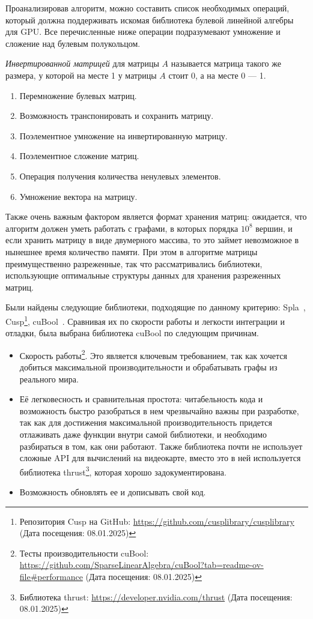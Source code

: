 Проанализировав алгоритм, можно составить список необходимых операций, который должна поддерживать искомая библиотека булевой линейной алгебры для GPU. Все перечисленные ниже операции подразумевают умножение и сложение над булевым полукольцом.

\textit{Инвертированной матрицей} для матрицы $A$ называется матрица такого же размера, у которой на месте 1 у матрицы $A$ стоит 0, а на месте 0 --- 1. 

\begin{enumerate}
    \item Перемножение булевых матриц.
    \item Возможность транспонировать и сохранить матрицу.
    \item Поэлементное умножение на инвертированную матрицу.
    \item Поэлементное сложение матриц.
    \item Операция получения количества ненулевых элементов.
    \item Умножение вектора на матрицу.
\end{enumerate}

Также очень важным фактором является формат хранения матриц: ожидается, что алгоритм должен уметь работать с графами, в которых порядка $10^8$ вершин, и если хранить матрицу в виде двумерного массива, то это займет невозможное в нынешнее время количество памяти. 
При этом в алгоритме матрицы преимущественно разреженные, так что рассматривались библиотеки, использующие оптимальные структуры данных для хранения разреженных матриц.

Были найдены следующие библиотеки, подходящие по данному критерию: Spla~\cite{Spla}, Cusp\footnote{Репозитория Cusp на GitHub: \url{https://github.com/cusplibrary/cusplibrary} (Дата посещения: 08.01.2025)}, cuBool~\cite{CuBool}.
Сравнивая их по скорости работы и легкости интеграции и отладки, была выбрана библиотека cuBool по следующим причинам.

\begin{itemize}
    \item Скорость работы\footnote{Тесты производительности cuBool: \url{
https://github.com/SparseLinearAlgebra/cuBool?tab=readme-ov-file\#performance} (Дата посещения: 08.01.2025)}. Это является ключевым требованием, так как хочется добиться максимальной производительности и обрабатывать графы из реального мира.
    \item Её легковесность и сравнительная простота: читабельность кода и возможность быстро разобраться в нем чрезвычайно важны при разработке, так как для достижения максимальной производительность придется отлаживать даже функции внутри самой библиотеки, и необходимо разбираться в том, как они работают. Также библиотека почти не использует сложные API для вычислений на видеокарте, вместо это в ней используется библиотека thrust\footnote{Библиотека thrust: \url{https://developer.nvidia.com/thrust} (Дата посещения: 08.01.2025)}, которая хорошо задокументирована.
    \item Возможность обновлять ее и дописывать свой код.
\end{itemize}


